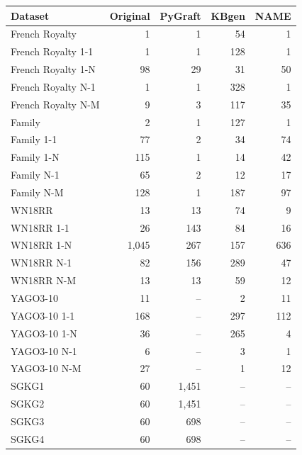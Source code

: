\begin{tabular}{lrrrr}
\toprule
Dataset & Original & PyGraft & KBgen & NAME \\
\midrule
French Royalty & 1 & 1 & 54 & 1 \\
French Royalty 1-1 & 1 & 1 & 128 & 1 \\
French Royalty 1-N & 98 & 29 & 31 & 50 \\
French Royalty N-1 & 1 & 1 & 328 & 1 \\
French Royalty N-M & 9 & 3 & 117 & 35 \\
\midrule
Family & 2 & 1 & 127 & 1 \\
Family 1-1 & 77 & 2 & 34 & 74 \\
Family 1-N & 115 & 1 & 14 & 42 \\
Family N-1 & 65 & 2 & 12 & 17 \\
Family N-M & 128 & 1 & 187 & 97 \\
\midrule
WN18RR & 13 & 13 & 74 & 9 \\
WN18RR 1-1 & 26 & 143 & 84 & 16 \\
WN18RR 1-N & 1{,}045 & 267 & 157 & 636 \\
WN18RR N-1 & 82 & 156 & 289 & 47 \\
WN18RR N-M & 13 & 13 & 59 & 12 \\
\midrule
YAGO3-10 & 11 & – & 2 & 11 \\
YAGO3-10 1-1 & 168 & – & 297 & 112 \\
YAGO3-10 1-N & 36 & – & 265 & 4 \\
YAGO3-10 N-1 & 6 & – & 3 & 1 \\
YAGO3-10 N-M & 27 & – & 1 & 12 \\
\midrule
SGKG1 & 60 & 1{,}451 & – & – \\
SGKG2 & 60 & 1{,}451 & – & – \\
SGKG3 & 60 & 698 & – & – \\
SGKG4 & 60 & 698 & – & – \\
\bottomrule
\end{tabular}
